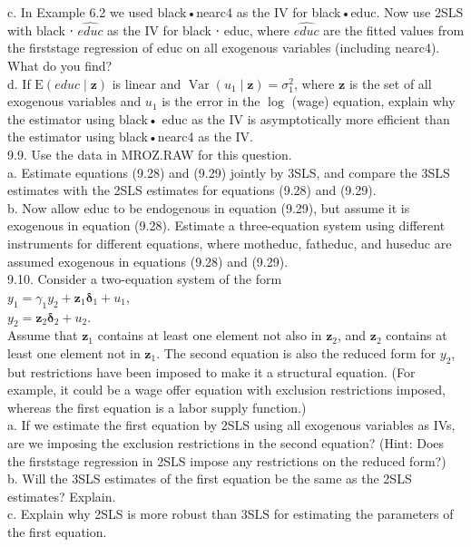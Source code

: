 \documentclass[10pt]{article}
\begin{document}
c. In Example 6.2 we used black•nearc4 as the IV for black•educ. Now use 2SLS with black ⋅ $\widehat{e d u c}$ as the IV for black ⋅ educ, where $\widehat{e d u c}$ are the fitted values from the firststage regression of educ on all exogenous variables (including nearc4). What do you find?\\
d. If $\mathrm{E}(e d u c \mid \mathbf{z})$ is linear and $\operatorname{Var}\left(u_{1} \mid \mathbf{z}\right)=\sigma_{1}^{2}$, where $\mathbf{z}$ is the set of all exogenous variables and $u_{1}$ is the error in the $\log$ (wage) equation, explain why the estimator using black• educ as the IV is asymptotically more efficient than the estimator using black•nearc4 as the IV.\\
9.9. Use the data in MROZ.RAW for this question.\\
a. Estimate equations (9.28) and (9.29) jointly by 3SLS, and compare the 3SLS estimates with the 2SLS estimates for equations (9.28) and (9.29).\\
b. Now allow educ to be endogenous in equation (9.29), but assume it is exogenous in equation (9.28). Estimate a three-equation system using different instruments for different equations, where motheduc, fatheduc, and huseduc are assumed exogenous in equations (9.28) and (9.29).\\
9.10. Consider a two-equation system of the form\\
$y_{1}=\gamma_{1} y_{2}+\mathbf{z}_{1} \boldsymbol{\delta}_{1}+u_{1}$,\\
$y_{2}=\mathbf{z}_{2} \boldsymbol{\delta}_{2}+u_{2}$.\\
Assume that $\mathbf{z}_{1}$ contains at least one element not also in $\mathbf{z}_{2}$, and $\mathbf{z}_{2}$ contains at least one element not in $\mathbf{z}_{1}$. The second equation is also the reduced form for $y_{2}$, but restrictions have been imposed to make it a structural equation. (For example, it could be a wage offer equation with exclusion restrictions imposed, whereas the first equation is a labor supply function.)\\
a. If we estimate the first equation by 2SLS using all exogenous variables as IVs, are we imposing the exclusion restrictions in the second equation? (Hint: Does the firststage regression in 2SLS impose any restrictions on the reduced form?)\\
b. Will the 3SLS estimates of the first equation be the same as the 2SLS estimates? Explain.\\
c. Explain why 2SLS is more robust than 3SLS for estimating the parameters of the first equation.\\
\end{document}
